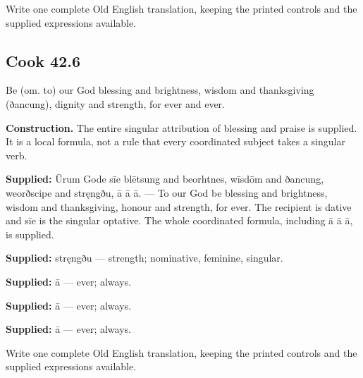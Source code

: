 Write one complete Old English translation, keeping the printed controls and the supplied expressions available.

\par\begin{minipage}{\linewidth}\raggedright
\subsection*{Cook 42.6}

Be (om. to) our God blessing and brightness, wisdom and thanksgiving (ðancung), dignity and strength, for ever and ever.

\end{minipage}\par\addvspace{4pt}

\textbf{Construction.} The entire singular attribution of blessing and praise is supplied. It is a local formula, not a rule that every coordinated subject takes a singular verb.

\textbf{Supplied:} Ūrum Gode sīe blētsung and beorhtnes, wīsdōm and ðancung, weorðscipe and stręngðu, ā ā ā. — To our God be blessing and brightness, wisdom and thanksgiving, honour and strength, for ever. The recipient is dative and sīe is the singular optative. The whole coordinated formula, including ā ā ā, is supplied.

\textbf{Supplied:} stręngðu — strength; nominative, feminine, singular.

\textbf{Supplied:} ā — ever; always.

\textbf{Supplied:} ā — ever; always.

\textbf{Supplied:} ā — ever; always.

Write one complete Old English translation, keeping the printed controls and the supplied expressions available.

